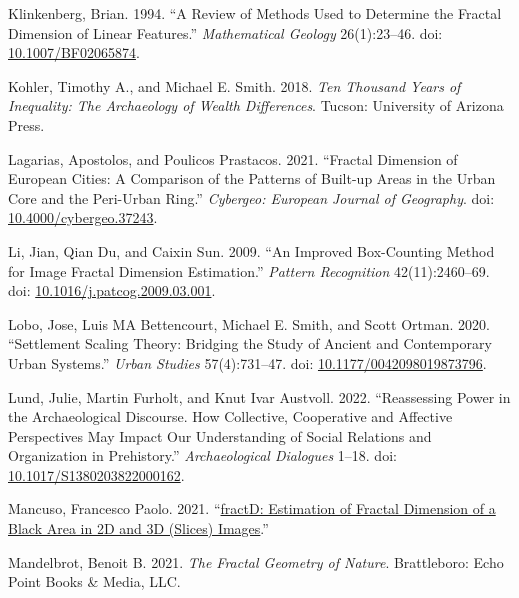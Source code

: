 \documentclass[
  12pt,
]{book}
\newlength{\cslhangindent}
\newlength{\cslentryspacingunit} %
\newenvironment{CSLReferences}[2] %
 {%
  \setlength{\parindent}{0pt}
  \ifodd #1
  \let\oldpar\par
  \def\par{\hangindent=\cslhangindent\oldpar}
  \fi
  \setlength{\parskip}{#2\cslentryspacingunit}
 }%
 {}
\begin{document}
\begin{CSLReferences}{1}{0}
\leavevmode{}%
Klinkenberg, Brian. 1994. {``A Review of Methods Used to Determine the Fractal Dimension of Linear Features.''} \emph{Mathematical Geology} 26(1):23--46. doi: \href{https://doi.org/10.1007/BF02065874}{10.1007/BF02065874}.

\leavevmode{}%
Kohler, Timothy A., and Michael E. Smith. 2018. \emph{Ten Thousand Years of Inequality: The Archaeology of Wealth Differences}. Tucson: University of Arizona Press.

\leavevmode{}%
Lagarias, Apostolos, and Poulicos Prastacos. 2021. {``Fractal Dimension of European Cities: A Comparison of the Patterns of Built-up Areas in the Urban Core and the Peri-Urban Ring.''} \emph{Cybergeo: European Journal of Geography}. doi: \href{https://doi.org/10.4000/cybergeo.37243}{10.4000/cybergeo.37243}.

\leavevmode{}%
Li, Jian, Qian Du, and Caixin Sun. 2009. {``An Improved Box-Counting Method for Image Fractal Dimension Estimation.''} \emph{Pattern Recognition} 42(11):2460--69. doi: \href{https://doi.org/10.1016/j.patcog.2009.03.001}{10.1016/j.patcog.2009.03.001}.

\leavevmode{}%
Lobo, Jose, Luis MA Bettencourt, Michael E. Smith, and Scott Ortman. 2020. {``Settlement Scaling Theory: Bridging the Study of Ancient and Contemporary Urban Systems.''} \emph{Urban Studies} 57(4):731--47. doi: \href{https://doi.org/10.1177/0042098019873796}{10.1177/0042098019873796}.

\leavevmode{}%
Lund, Julie, Martin Furholt, and Knut Ivar Austvoll. 2022. {``Reassessing Power in the Archaeological Discourse. How Collective, Cooperative and Affective Perspectives May Impact Our Understanding of Social Relations and Organization in Prehistory.''} \emph{Archaeological Dialogues} 1--18. doi: \href{https://doi.org/10.1017/S1380203822000162}{10.1017/S1380203822000162}.

\leavevmode{}%
Mancuso, Francesco Paolo. 2021. {``\href{https://CRAN.R-project.org/package=fractD}{fractD: Estimation of Fractal Dimension of a Black Area in 2D and 3D (Slices) Images}.''}

\leavevmode{}%
Mandelbrot, Benoit B. 2021. \emph{The Fractal Geometry of Nature}. Brattleboro: Echo Point Books \& Media, LLC.


\end{CSLReferences}
\end{document}
